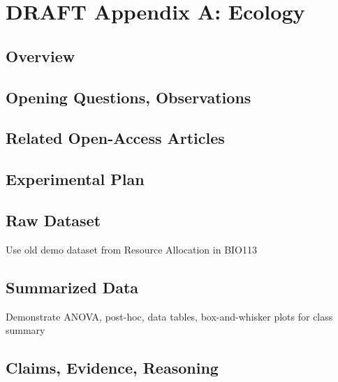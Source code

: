 \documentclass[
]{book}
\begin{document}
\hypertarget{draft-appendix-a-ecology}{%
\chapter*{DRAFT Appendix A: Ecology}\label{draft-appendix-a-ecology}}

\hypertarget{appa810}{%
\section{Overview}\label{appa810}}

\hypertarget{opening-questions-observations}{%
\section{Opening Questions, Observations}\label{opening-questions-observations}}

\hypertarget{related-open-access-articles}{%
\section{Related Open-Access Articles}\label{related-open-access-articles}}

\hypertarget{experimental-plan}{%
\section{Experimental Plan}\label{experimental-plan}}

\hypertarget{raw-dataset}{%
\section{Raw Dataset}\label{raw-dataset}}

Use old demo dataset from Resource Allocation in BIO113

\hypertarget{summarized-data}{%
\section{Summarized Data}\label{summarized-data}}

Demonstrate ANOVA, post-hoc, data tables, box-and-whisker plots for class summary

\hypertarget{claims-evidence-reasoning}{%
\section{Claims, Evidence, Reasoning}\label{claims-evidence-reasoning}}
\end{document}
